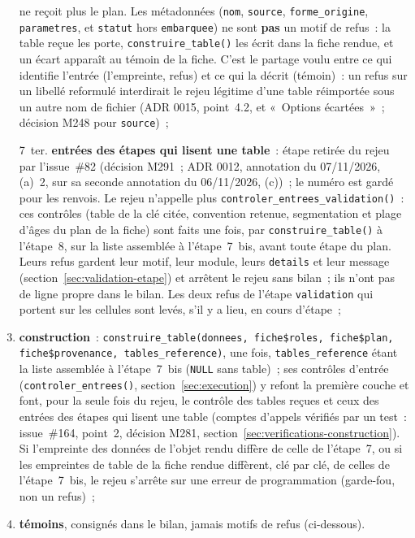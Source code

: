 \documentclass[a4paper,11pt]{article}
\newcommand{\code}[1]{\texttt{\small #1}}
\begin{document}
\begin{enumerate}[leftmargin=*, itemsep=2pt]
    ne reçoit plus le plan. Les métadonnées
    (\code{nom}, \code{source}, \code{forme\_origine}, \code{parametres},
    et \code{statut} hors \code{embarquee}) ne sont \textbf{pas} un motif de
    refus~: la table reçue les porte, \code{construire\_table()} les écrit
    dans la fiche rendue, et un écart apparaît au témoin de la fiche. C'est
    le partage voulu entre ce qui identifie l'entrée (l'empreinte, refus) et
    ce qui la décrit (témoin)~: un refus sur un libellé reformulé
    interdirait le rejeu légitime d'une table réimportée sous un autre nom
    de fichier (ADR 0015, point~4.2, et «~Options écartées~»~; décision
    M248 pour \code{source})~;
  \item[7~ter.] \textbf{entrées des étapes qui lisent une table}~: étape
    retirée du rejeu par l'issue~\#82 (décision M291~; ADR 0012, annotation
    du 07/11/2026, (a)~2, sur sa seconde annotation du 06/11/2026, (c))~;
    le numéro est gardé pour les renvois. Le rejeu n'appelle plus
    \code{controler\_entrees\_validation()}~: ces contrôles (table de la clé
    citée, convention retenue, segmentation et plage d'âges du plan de la
    fiche) sont faits une fois, par \code{construire\_table()} à l'étape~8,
    sur la liste assemblée à l'étape~7~bis, avant toute étape du plan. Leurs
    refus gardent leur motif, leur module, leurs \code{details} et leur
    message (section~\ref{sec:validation-etape}) et arrêtent le rejeu sans
    bilan~; ils n'ont pas de ligne propre dans le bilan. Les deux refus de
    l'étape \code{validation} qui portent sur les cellules sont levés, s'il y
    a lieu, en cours d'étape~;
  \item \textbf{construction}~:
    \code{construire\_table(donnees, fiche\$roles, fiche\$plan, fiche\$provenance, tables\_reference)},
    une fois, \code{tables\_reference} étant la liste assemblée à
    l'étape~7~bis (\code{NULL} sans table)~; ses contrôles d'entrée
    (\code{controler\_entrees()}, section~\ref{sec:execution}) y refont la
    première couche et font, pour la seule fois du rejeu, le contrôle des tables
    reçues et ceux des entrées des étapes qui lisent une table (comptes
    d'appels vérifiés par un test~: issue~\#164, point~2, décision M281,
    section~\ref{sec:verifications-construction}). Si l'empreinte des données de
    l'objet rendu diffère de celle de l'étape~7, ou si les empreintes de
    table de la fiche rendue diffèrent, clé par clé, de celles de
    l'étape~7~bis, le rejeu s'arrête sur une erreur de programmation
    (garde-fou, non un refus)~;
  \item \textbf{témoins}, consignés dans le bilan, jamais motifs de refus
    (ci-dessous).
\end{enumerate}
\end{document}
